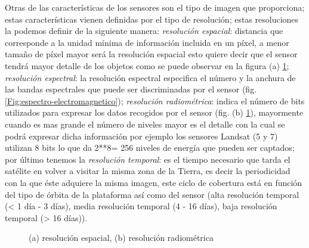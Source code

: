 Otras de las características de los sensores son el tipo de imagen que proporciona; estas características vienen definidas por el tipo de resolución; estas resoluciones la podemos definir de la siguiente manera: \textit{resolución espacial}: distancia que corresponde a la unidad mínima de información incluida en un píxel, a menor tamaño de píxel mayor será la resolución espacial esto quiere decir que el sensor tendrá mayor detalle de los objetos como se puede observar en la figura (a) \ref{Fig:resoluciones};  
\textit{resolución espectral}: la resolución espectral especifica el número y la anchura de las bandas espectrales que puede ser discriminadas por el sensor (fig.  \ref{Fig:espectro-electromagnetico}); \textit{resolución radiométrica}: indica el número de bits utilizados para expresar los datos recogidos por el sensor (fig. (b) \ref{Fig:resoluciones}), mayormente cuando es mas grande el número de niveles mayor es el detalle con la cual se podrá expresar dicha información por ejemplo los sensores Landsat (5 y 7) utilizan 8 bits lo que da 2**8= 256 niveles de energía que pueden ser captados; por último tenemos la \textit{resolución temporal}: es el tiempo necesario que tarda el satélite en volver a visitar la misma zona de la Tierra, es decir la periodicidad con la que éste adquiere la misma imagen, este ciclo de cobertura está en función del tipo de órbita de la plataforma así como del sensor (alta resolución temporal (< 1 día - 3 días), media resolución temporal (4 - 16 días), baja resolución temporal (> 16 días)).


\begin{figure}[htbp]
\centering
{}

\caption{(a) resolución espacial, (b) resolución radiométrica}\label{Fig:resoluciones}
\end{figure}


